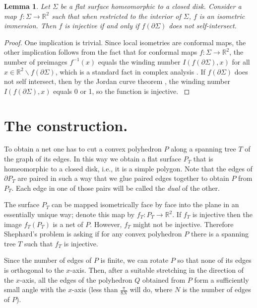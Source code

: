 \documentclass{article}
\theoremstyle{theorem}
\newtheorem{lema}[teorema]{Lemma}
\newcommand{\field}[1]{\ensuremath{\mathbb{#1}}}
\newcommand{\R}{\field{R}}
\begin{document}

\begin{lema}\label{Argument}
{Let $\Sigma$ be a flat surface homeomorphic to a closed disk. Consider a map $f \colon \Sigma \rightarrow \mathbb{R}^2$ such that when restricted to the interior of $\Sigma$, $f$ is an isometric immersion. Then $f$ is injective if and only if $f(\partial \Sigma )$ does not self-intersect. 
}
\end{lema}

\begin{proof}
{\rm One implication is trivial. Since local isometries are conformal maps, the other implication follows from the fact that for conformal maps $f \colon \Sigma \rightarrow \mathbb{R}^2$, the number of preimages $f^{-1}(x)$ equals the winding number $I(f(\partial \Sigma ), x )$ for all $x \in \R^2  \backslash f(\partial \Sigma)$, which is a standard fact in complex analysis \cite[p.34]{Ma}. If $f(\partial \Sigma)$ does not self intersect, then by the Jordan curve theorem \cite{Ha}, the winding number $I(f(\partial \Sigma ), x )$ equals 0 or 1, so the function is injective.
}
\end{proof}


\section*{The construction.}




To obtain a net one has to cut a convex polyhedron $P$ along a spanning tree $T$ of the graph of its edges. In this way we obtain a flat surface $P_T$ that is homeomorphic to a closed disk, i.e., it is a simple polygon. Note that the edges of $\partial P_T$ are paired in such a way that we glue paired edges together to obtain $P$ from $P_T$. Each edge in one of those pairs will be called the \textit{dual} of the other.

The surface $P_T$ can be mapped isometrically face by face into the plane in an essentially unique way; denote this map by $f_T\colon P_T\to \mathbb{R}^2$. If $f_T$ is injective then the image $f_T(P_T)$ is a net of $P$. However, $f_T$ might not be injective. Therefore Shephard's problem is asking if for any convex polyhedron $P$ there is a spanning tree $T$ such that $f_T$ is injective.




Since the number of edges of $P$ is finite, we can rotate $P$ so that none of its edges is orthogonal to the $x$-axis. Then, after a suitable stretching in the direction of the $x$-axis, all the edges of the polyhedron $Q$ obtained from $P$ form a sufficiently small angle with the $x$-axis (less than $\frac{\pi}{8 N}$ will do, where $N$ is the number of edges of $P$).
\end{document}
